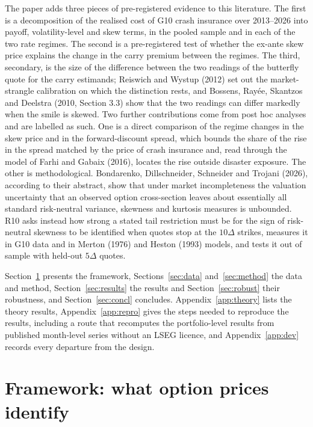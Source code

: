 \documentclass[11pt]{article}
\theoremstyle{result}
\newcommand{\D}{\Delta}
\begin{document}
The paper adds three pieces of pre-registered evidence to this literature. The first is a decomposition of the realised cost of G10 crash insurance over 2013--2026 into payoff, volatility-level and skew terms, in the pooled sample and in each of the two rate regimes. The second is a pre-registered test of whether the ex-ante skew price explains the change in the carry premium between the regimes. The third, secondary, is the size of the difference between the two readings of the butterfly quote for the carry estimands; Reiswich and Wystup (2012) set out the market-strangle calibration on which the distinction rests, and Bossens, Ray\'ee, Skantzos and Deelstra (2010, Section 3.3) show that the two readings can differ markedly when the smile is skewed. Two further contributions come from post hoc analyses and are labelled as such. One is a direct comparison of the regime changes in the skew price and in the forward-discount spread, which bounds the share of the rise in the spread matched by the price of crash insurance and, read through the model of Farhi and Gabaix (2016), locates the rise outside disaster exposure. The other is methodological. Bondarenko, Dillschneider, Schneider and Trojani (2026), according to their abstract, show that under market incompleteness the valuation uncertainty that an observed option cross-section leaves about essentially all standard risk-neutral variance, skewness and kurtosis measures is unbounded. R10 asks instead how strong a stated tail restriction must be for the sign of risk-neutral skewness to be identified when quotes stop at the $10\D$ strikes, measures it in G10 data and in Merton (1976) and Heston (1993) models, and tests it out of sample with held-out $5\D$ quotes.

Section~\ref{sec:framework} presents the framework, Sections~\ref{sec:data} and~\ref{sec:method} the data and method, Section~\ref{sec:results} the results and Section~\ref{sec:robust} their robustness, and Section~\ref{sec:concl} concludes. Appendix~\ref{app:theory} lists the theory results, Appendix~\ref{app:repro} gives the steps needed to reproduce the results, including a route that recomputes the portfolio-level results from published month-level series without an LSEG licence, and Appendix~\ref{app:dev} records every departure from the design.

\section{Framework: what option prices identify}\label{sec:framework}
\end{document}
